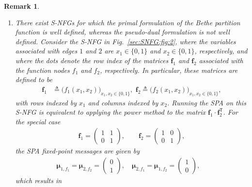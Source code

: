 \documentclass[journal]{IEEEtran}
\newtheorem{remark}[theorem]{Remark}
\newcommand{\vect}[1]{ \bm{#1} }
\newcommand{\tran}{\mathsf{T}}
\newcommand{\vmu}{ \vect{ \mu } }
\newcommand{\defeq}{ \triangleq }
\newcommand{\matr}[1]{\vect{#1}}
\begin{document}
\begin{remark}
\begin{enumerate}
    \item\label{sec:SNFG:remk:1:item:2} There exist S-NFGs for which the
          primal formulation of the Bethe partition function is well defined,
          whereas the pseudo-dual formulation is not well defined.  Consider
          the S-NFG in Fig.~\ref{sec:SNFG:fig:2}, where the variables
          associated with edges $1$ and $ 2 $ are $ x_{1} \in \{0,1\} $ and
          $ x_{2} \in \{0,1\} $, respectively, and where the dots denote the
          row index of the matrices $ \matr{f}_{1} $ and $ \matr{f}_{2} $
          associated with the function nodes $ f_{1} $ and $ f_{2} $,
          respectively.  In particular, these matrices are defined to be
          \begin{align*}
            \matr{f}_{1} & \defeq
            \bigl( f_{1}(x_{1},x_{2}) \bigr)_{ \! x_{1} ,x_{2} \in \{0,1\} },\,\,
            \matr{f}_{2}\defeq
            \bigl( f_{2}(x_{1},x_{2}) \bigr)_{ \!x_{1} ,x_{2} \in \{0,1\} },
          \end{align*}
          with rows indexed by $ x_{1} $ and columns indexed by $ x_{2}
          $. Running the SPA on this S-NFG is equivalent to applying the power
          method to the matrix $ \matr{f}_{1} \cdot \matr{f}_{2}^{\tran}
          $. For the special case
          \begin{align*}
            \matr{f}_{1}
            = \begin{pmatrix}
                1 & 1 \\ 0 & 1
              \end{pmatrix},
            \qquad
            \matr{f}_{2}
            = \begin{pmatrix}
                1 & 0 \\ 0 & 1
              \end{pmatrix},
          \end{align*}
          the SPA fixed-point messages are given by
          \begin{align*}
            \vmu_{1,f_{1}}= \vmu_{2,f_{2}} = \begin{pmatrix} 0 \\ 1 \end{pmatrix}, \quad
            \vmu_{2,f_{1}}= \vmu_{1,f_{2}} = \begin{pmatrix} 1 \\ 0 \end{pmatrix}, \quad
          \end{align*}
          which results in
          \begin{align*}

\end{align*}
\end{enumerate}
\end{remark}
\end{document}
